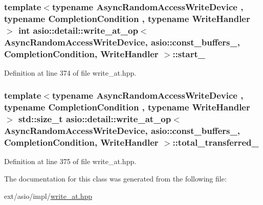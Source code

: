 \subsubsection[{start\+\_\+}]{\setlength{\rightskip}{0pt plus 5cm}template$<$typename Async\+Random\+Access\+Write\+Device , typename Completion\+Condition , typename Write\+Handler $>$ int {\bf asio\+::detail\+::write\+\_\+at\+\_\+op}$<$ Async\+Random\+Access\+Write\+Device, {\bf asio\+::const\+\_\+buffers\+\_},                           Completion\+Condition, Write\+Handler $>$\+::start\+\_\+}\label{classasio_1_1detail_1_1write__at__op_3_01_async_random_access_write_device_00_01asio_1_1const__bfac42b27d8d08bd8bf66a7fd473767cd_a4fdfffddcc3f7b0dc06311258c45f2b7}


Definition at line 374 of file write\+\_\+at.\+hpp.

\hypertarget{classasio_1_1detail_1_1write__at__op_3_01_async_random_access_write_device_00_01asio_1_1const__bfac42b27d8d08bd8bf66a7fd473767cd_a61c09b928b0ed27b195329b6381577eb}{}
\subsubsection[{total\+\_\+transferred\+\_\+}]{\setlength{\rightskip}{0pt plus 5cm}template$<$typename Async\+Random\+Access\+Write\+Device , typename Completion\+Condition , typename Write\+Handler $>$ std\+::size\+\_\+t {\bf asio\+::detail\+::write\+\_\+at\+\_\+op}$<$ Async\+Random\+Access\+Write\+Device, {\bf asio\+::const\+\_\+buffers\+\_},                           Completion\+Condition, Write\+Handler $>$\+::total\+\_\+transferred\+\_\+}\label{classasio_1_1detail_1_1write__at__op_3_01_async_random_access_write_device_00_01asio_1_1const__bfac42b27d8d08bd8bf66a7fd473767cd_a61c09b928b0ed27b195329b6381577eb}


Definition at line 375 of file write\+\_\+at.\+hpp.



The documentation for this class was generated from the following file\+:\begin{DoxyCompactItemize}
\item 
ext/asio/impl/\hyperlink{impl_2write__at_8hpp}{write\+\_\+at.\+hpp}\end{DoxyCompactItemize}

